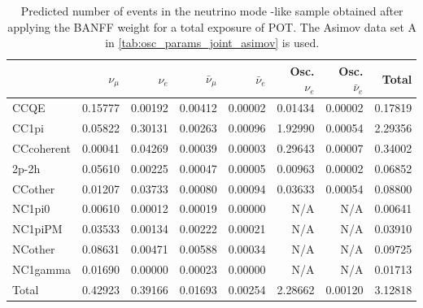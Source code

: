 
\begin{table}
\center
\begin{tabular} { | l ||r | r | r | r | r | r | | r | }
\hline
\hline
              & $\nu_\mu$            & $\nu_e$              & $\bar{\nu}_{\mu}$    & $\bar{\nu}_{e}$      & Osc. $\nu_e$         & Osc. $\bar{\nu}_{e}$ & Total                \\ \hline\hline
 CCQE         & 0.15777              & 0.00192              & 0.00412              & 0.00002              & 0.01434              & 0.00002              & 0.17819              \\ \hline
 CC1pi        & 0.05822              & 0.30131              & 0.00263              & 0.00096              & 1.92990              & 0.00054              & 2.29356              \\ \hline
 CCcoherent   & 0.00041              & 0.04269              & 0.00039              & 0.00003              & 0.29643              & 0.00007              & 0.34002              \\ \hline
 2p-2h        & 0.05610              & 0.00225              & 0.00047              & 0.00005              & 0.00963              & 0.00002              & 0.06852              \\ \hline
 CCother      & 0.01207              & 0.03733              & 0.00080              & 0.00094              & 0.03633              & 0.00054              & 0.08800              \\ \hline
 NC1pi0       & 0.00610              & 0.00012              & 0.00019              & 0.00000              & N/A                  & N/A                  & 0.00641              \\ \hline
 NC1piPM      & 0.03533              & 0.00134              & 0.00222              & 0.00021              & N/A                  & N/A                  & 0.03910              \\ \hline
 NCother      & 0.08631              & 0.00471              & 0.00588              & 0.00034              & N/A                  & N/A                  & 0.09725              \\ \hline
 NC1gamma     & 0.01690              & 0.00000              & 0.00023              & 0.00000              & N/A                  & N/A                  & 0.01713              \\ \hline
\hline
 Total        & 0.42923              & 0.39166              & 0.01693              & 0.00254              & 2.28662              & 0.00120              & 3.12818              \\ \hline
\end{tabular}
\caption{
Predicted number of events in the neutrino mode \nueCConepi{}-like sample
obtained after applying the BANFF weight
for a total exposure of \TotalPotNu{} POT.
The Asimov data set A in \cref{tab:osc_params_joint_asimov} is used.
}
\label{tab:events_cconepi_Asimov_A}
\end{table}


